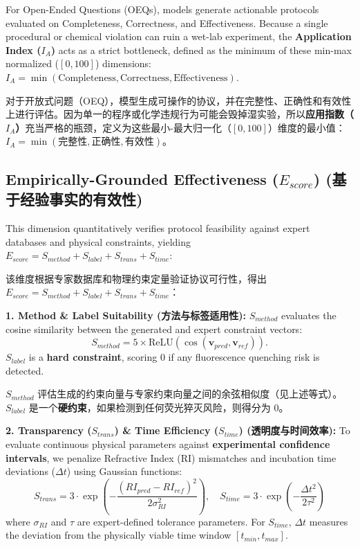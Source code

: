 \documentclass[runningheads]{llncs}
\begin{document}
For Open-Ended Questions (OEQs), models generate actionable protocols evaluated on Completeness, Correctness, and Effectiveness. Because a single procedural or chemical violation can ruin a wet-lab experiment, the \textbf{Application Index ($I_A$)} acts as a strict bottleneck, defined as the minimum of these min-max normalized ($[0, 100]$) dimensions: $I_A = \min(\text{Completeness}, \text{Correctness}, \text{Effectiveness})$.

对于开放式问题（OEQ），模型生成可操作的协议，并在完整性、正确性和有效性上进行评估。因为单一的程序或化学违规行为可能会毁掉湿实验，所以\textbf{应用指数（$I_A$）}充当严格的瓶颈，定义为这些最小-最大归一化（$[0, 100]$）维度的最小值：$I_A = \min(\text{完整性}, \text{正确性}, \text{有效性})$。

\subsection{Empirically-Grounded Effectiveness ($E_{score}$) (基于经验事实的有效性)}

This dimension quantitatively verifies protocol feasibility against expert databases and physical constraints, yielding $E_{score} = S_{method} + S_{label} + S_{trans} + S_{time}$:

该维度根据专家数据库和物理约束定量验证协议可行性，得出 $E_{score} = S_{method} + S_{label} + S_{trans} + S_{time}$：

\noindent\textbf{1. Method \& Label Suitability (方法与标签适用性):} 
$S_{method}$ evaluates the cosine similarity between the generated and expert constraint vectors: 
\begin{equation}
S_{method} = 5 \times \text{ReLU}(\cos(\mathbf{v}_{pred}, \mathbf{v}_{ref})). 
\end{equation}
$S_{label}$ is a \textbf{hard constraint}, scoring 0 if any fluorescence quenching risk is detected.

$S_{method}$ 评估生成的约束向量与专家约束向量之间的余弦相似度（见上述等式）。$S_{label}$ 是一个\textbf{硬约束}，如果检测到任何荧光猝灭风险，则得分为 0。

\noindent\textbf{2. Transparency ($S_{trans}$) \& Time Efficiency ($S_{time}$) (透明度与时间效率):} 
To evaluate continuous physical parameters against \textbf{experimental confidence intervals}, we penalize Refractive Index (RI) mismatches and incubation time deviations ($\Delta t$) using Gaussian functions:
\begin{equation}
S_{trans} = 3 \cdot \exp \left( - \frac{(RI_{pred} - RI_{ref})^2}{2\sigma_{RI}^2} \right), \quad
S_{time} = 3 \cdot \exp \left( - \frac{\Delta t^2}{2\tau^2} \right)
\end{equation}
where $\sigma_{RI}$ and $\tau$ are expert-defined tolerance parameters. For $S_{time}$, $\Delta t$ measures the deviation from the physically viable time window $[t_{min}, t_{max}]$.
\end{document}
